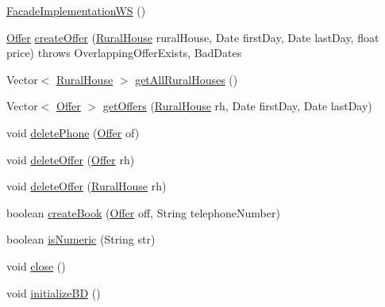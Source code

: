 \begin{DoxyCompactItemize}
\item 
\mbox{\hyperlink{classbusiness_logic_1_1_facade_implementation_w_s_a22415eec1f4d0a160f02cfdc1ac80825}{Facade\+Implementation\+WS}} ()
\item 
\mbox{\hyperlink{classdomain_1_1_offer}{Offer}} \mbox{\hyperlink{classbusiness_logic_1_1_facade_implementation_w_s_ac7b3bdfd0815ea7c787da312de594cce}{create\+Offer}} (\mbox{\hyperlink{classdomain_1_1_rural_house}{Rural\+House}} rural\+House, Date first\+Day, Date last\+Day, float price)  throws Overlapping\+Offer\+Exists, Bad\+Dates 
\item 
Vector$<$ \mbox{\hyperlink{classdomain_1_1_rural_house}{Rural\+House}} $>$ \mbox{\hyperlink{classbusiness_logic_1_1_facade_implementation_w_s_aa6f21ddb40ca6cd752a13e31ff016e7e}{get\+All\+Rural\+Houses}} ()
\item 
Vector$<$ \mbox{\hyperlink{classdomain_1_1_offer}{Offer}} $>$ \mbox{\hyperlink{classbusiness_logic_1_1_facade_implementation_w_s_a7489fb15fdb8206b16daf6ed24fdfea0}{get\+Offers}} (\mbox{\hyperlink{classdomain_1_1_rural_house}{Rural\+House}} rh, Date first\+Day, Date last\+Day)
\item 
void \mbox{\hyperlink{classbusiness_logic_1_1_facade_implementation_w_s_ab3efd0077bc3ffd21e78cf2fb9f8709c}{delete\+Phone}} (\mbox{\hyperlink{classdomain_1_1_offer}{Offer}} of)
\item 
void \mbox{\hyperlink{classbusiness_logic_1_1_facade_implementation_w_s_a7d5bca5ebc3d420813ce40e0b47cfef9}{delete\+Offer}} (\mbox{\hyperlink{classdomain_1_1_offer}{Offer}} rh)
\item 
void \mbox{\hyperlink{classbusiness_logic_1_1_facade_implementation_w_s_a109173565a7d95250d9136e9540c13b9}{delete\+Offer}} (\mbox{\hyperlink{classdomain_1_1_rural_house}{Rural\+House}} rh)
\item 
boolean \mbox{\hyperlink{classbusiness_logic_1_1_facade_implementation_w_s_a89aa08f9fe033c295d7fcf0cb5571882}{create\+Book}} (\mbox{\hyperlink{classdomain_1_1_offer}{Offer}} off, String telephone\+Number)
\item 
boolean \mbox{\hyperlink{classbusiness_logic_1_1_facade_implementation_w_s_abde3726431e6d9708422689a30c9bbd6}{is\+Numeric}} (String str)
\item 
void \mbox{\hyperlink{classbusiness_logic_1_1_facade_implementation_w_s_aaf150e07dd6d71319c6f2f4bf6be1647}{close}} ()
\item 
void \mbox{\hyperlink{classbusiness_logic_1_1_facade_implementation_w_s_a94a4600e9c80794676f06c888e9e682d}{initialize\+BD}} ()
\end{DoxyCompactItemize}


